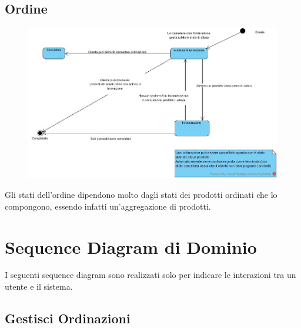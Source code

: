\subsection{Ordine}
\begin{figure}[H]
	\centering
	\includegraphics[width=1\textwidth]{Immagini/stati_ordinazione.jpg}
\end{figure}
Gli stati dell'ordine dipendono molto dagli stati dei prodotti ordinati che lo compongono, essendo infatti un'aggregazione di prodotti.

\section{Sequence Diagram di Dominio}
I seguenti sequence diagram sono realizzati solo per indicare le interazioni tra un utente e il sistema.

\subsection{Gestisci Ordinazioni}
